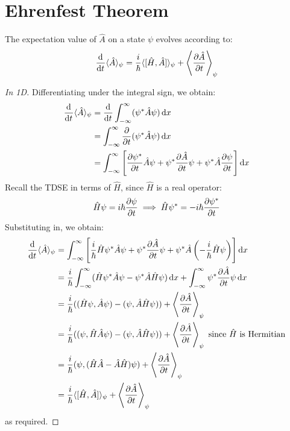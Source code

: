 \documentclass[../main.tex]{subfiles}
\begin{document}
\section{Ehrenfest Theorem}
\begin{theorem}[Ehrenfest]
  The expectation value of $\hat{A}$ on a state $\psi$ evolves according to:
  \[
    \deriv{}{t}\langle \hat{A} \rangle_{\psi} = \frac{i}{\hbar} \langle [\hat{H}, \hat{A}] \rangle_{\psi} + \left\langle \pderiv{\hat{A}}{t} \right\rangle_{\psi}
  \]
\end{theorem}
\begin{proof}[In 1D]
  Differentiating under the integral sign, we obtain:
  \begin{align*}
    \deriv{}{t}\langle \hat{A} \rangle_{\psi} &= \deriv{}{t} \int_{-\infty}^{\infty} (\psi^{*} \hat{A} \psi) \d{x} \\
                                              &= \int_{-\infty}^{\infty} \pderiv{}{t}(\psi^{*} \hat{A} \psi) \d{x} \\
                                              &= \int_{-\infty}^{\infty} \left[\pderiv{\psi^{*}}{t} \hat{A} \psi + \psi^{*} \pderiv{\hat{A}}{t} \psi + \psi^{*} \hat{A} \pderiv{\psi}{t}\right] \d{x}
  \end{align*}
  Recall the TDSE in terms of $\hat{H}$, since $\hat{H}$ is a real operator:
  \[
    \hat{H}\psi = i\hbar \pderiv{\psi}{t} \implies \hat{H} \psi^{*} = -i\hbar \pderiv{\psi^{*}}{t}
  \]
  Substituting in, we obtain:
  \begin{align*}
    \deriv{}{t}\langle \hat{A} \rangle_{\psi} &= \int_{-\infty}^{\infty} \left[\frac{i}{\hbar} \hat{H}\psi^{*}\hat{A}\psi + \psi^{*} \pderiv{\hat{A}}{t} \psi + \psi^{*} \hat{A}\left(-\frac{i}{\hbar} \hat{H} \psi\right)\right] \d{x} \\
                                              &= \frac{i}{\hbar} \int_{-\infty}^{\infty}(\hat{H} \psi^{*} \hat{A} \psi - \psi^{*} \hat{A} \hat{H} \psi) \d{x} + \int_{-\infty}^{\infty} \psi^{*} \pderiv{\hat{A}}{t} \psi \d{x} \\
                                              &= \frac{i}{\hbar} ((\hat{H}\psi, \hat{A}\psi) - (\psi, \hat{A}\hat{H}\psi)) + \left\langle \pderiv{\hat{A}}{t} \right\rangle_{\psi} \\
                                              &= \frac{i}{\hbar} ((\psi, \hat{H}\hat{A}\psi) - (\psi, \hat{A}\hat{H}\psi)) + \left\langle \pderiv{\hat{A}}{t} \right\rangle_{\psi} \text{ since $\hat{H}$ is Hermitian} \\
                                              &= \frac{i}{\hbar} (\psi, (\hat{H}\hat{A} - \hat{A} \hat{H})\psi) + \left\langle \pderiv{\hat{A}}{t} \right\rangle_{\psi} \\
                                              &= \frac{i}{\hbar} \langle [\hat{H}, \hat{A}] \rangle_{\psi} + \left\langle \pderiv{\hat{A}}{t} \right\rangle_{\psi}
  \end{align*}
  as required.
\end{proof}
\end{document}
